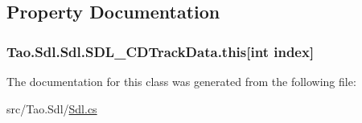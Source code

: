\subsection{Property Documentation}
\hypertarget{class_tao_1_1_sdl_1_1_sdl_1_1_s_d_l___c_d_track_data_a02f83bbed4124b86f0e41a8d12e2d1db}{
\subsubsection[{this}]{ Tao.Sdl.Sdl.SDL\_\-CDTrackData.this\mbox{[}int index\mbox{]}}}
\label{class_tao_1_1_sdl_1_1_sdl_1_1_s_d_l___c_d_track_data_a02f83bbed4124b86f0e41a8d12e2d1db}


The documentation for this class was generated from the following file:\begin{DoxyCompactItemize}
\item 
src/Tao.Sdl/\hyperlink{_sdl_8cs}{Sdl.cs}\end{DoxyCompactItemize}
